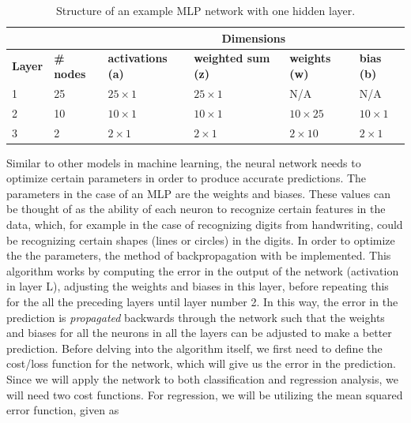 \documentclass[a4paper,10pt,english]{article}
\begin{document}
\begin{table}[] \centering
\begin{tabular}{ll|l|l|l|l|}
\cline{3-6}
                                     &                   & \multicolumn{4}{c|}{Dimensions}                                                                 \\ \hline
\multicolumn{1}{|l|}{\textbf{Layer}} & \textbf{\# nodes} & \textbf{activations (a)} & \textbf{weighted sum (z)} & \textbf{weights (w)} & \textbf{bias (b)} \\ \hline
\multicolumn{1}{|l|}{1}              & 25                & $25 \times 1$            & $25 \times 1$             & N/A                  & N/A               \\ \hline
\multicolumn{1}{|l|}{2}              & 10                & $10 \times 1$            & $10 \times 1$             & $10 \times 25$       & $10 \times 1$     \\ \hline
\multicolumn{1}{|l|}{3}              & 2                 & $2 \times 1$             & $2 \times 1$              & $2 \times 10$        & $2 \times 1$      \\ \hline
\end{tabular}
\caption{Structure of an example MLP network with one hidden layer.}
\label{tab:MLP_examp}
\end{table}

Similar to other models in machine learning, the neural network needs to optimize certain parameters in order to produce accurate predictions. The parameters in the case of an MLP are the weights and biases. These values can be thought of as the ability of each neuron to recognize certain features in the data, which, for example in the case of recognizing digits from handwriting, could be recognizing certain shapes (lines or circles) in the digits. In order to optimize the the parameters, the method of backpropagation with be implemented. This algorithm works by computing the error in the output of the network (activation in layer L), adjusting the weights and biases in this layer, before repeating this for the all the preceding layers until layer number 2. In this way, the error in the prediction is \textit{propagated} backwards through the network such that the weights and biases for all the neurons in all the layers can be adjusted to make a better prediction. Before delving into the algorithm itself, we first need to define the cost/loss function for the network, which will give us the error in the prediction. Since we will apply the network to both classification and regression analysis, we will need two cost functions. For regression, we will be utilizing the mean squared error function, given as
\end{document}
